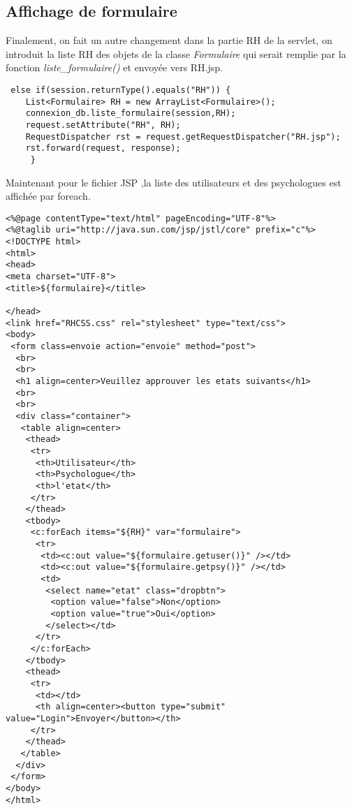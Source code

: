 \documentclass[12]{article}
\begin{document}
\subsection{Affichage de formulaire}

Finalement, on fait un autre changement dans la partie RH de la servlet, on introduit la liste RH des objets de la classe \textit{Formulaire} qui serait remplie par la fonction \textit{liste\_formulaire()} et envoyée vers RH.jsp.
\begin{scriptsize}

\lstset{language=java}
\begin{lstlisting}
 else if(session.returnType().equals("RH")) {
	List<Formulaire> RH = new ArrayList<Formulaire>();
	connexion_db.liste_formulaire(session,RH);
	request.setAttribute("RH", RH);
	RequestDispatcher rst = request.getRequestDispatcher("RH.jsp");
	rst.forward(request, response);
     }
\end{lstlisting}
\end{scriptsize}


Maintenant pour le fichier JSP ,la liste des utilisateurs et des psychologues est affichée par foreach.
\begin{scriptsize}

\lstset{language=XML}
\begin{lstlisting}
<%@page contentType="text/html" pageEncoding="UTF-8"%>
<%@taglib uri="http://java.sun.com/jsp/jstl/core" prefix="c"%>
<!DOCTYPE html>
<html>
<head>
<meta charset="UTF-8">
<title>${formulaire}</title>

</head>
<link href="RHCSS.css" rel="stylesheet" type="text/css">
<body>
 <form class=envoie action="envoie" method="post">
  <br>
  <br>
  <h1 align=center>Veuillez approuver les etats suivants</h1>
  <br>
  <br>
  <div class="container">
   <table align=center>
    <thead>
     <tr>
      <th>Utilisateur</th>
      <th>Psychologue</th>
      <th>l'etat</th>
     </tr>
    </thead>
    <tbody>
     <c:forEach items="${RH}" var="formulaire">
      <tr>
       <td><c:out value="${formulaire.getuser()}" /></td>
       <td><c:out value="${formulaire.getpsy()}" /></td>
       <td>
        <select name="etat" class="dropbtn">
         <option value="false">Non</option>
         <option value="true">Oui</option>
        </select></td>
      </tr>
     </c:forEach>
    </tbody>
    <thead>
     <tr>
      <td></td>
      <th align=center><button type="submit" value="Login">Envoyer</button></th>
     </tr>
    </thead>
   </table>
  </div>
 </form>
</body>
</html>

\end{lstlisting}
\end{scriptsize}
 
\end{document}
